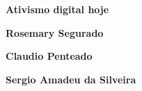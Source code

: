 \textbf{Ativismo digital hoje} \lipsum[1]

\textbf{Rosemary Segurado} \lipsum[2]

\textbf{Claudio Penteado} \lipsum[3]

\textbf{Sergio Amadeu da Silveira} \lipsum[4]


